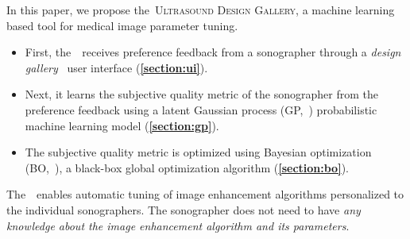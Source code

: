 In this paper, we propose the~\textsc{Ultrasound Design Gallery}, a machine learning based tool for medical image parameter tuning.
\begin{itemize}
    \item[\ding{228}] First, the~\usdg~receives preference feedback from a sonographer through a \textit{design gallery}~\cite{brochu_bayesian_2010, 10.1145/3072959.3073598, koyama_sequential_2020, phan_color_2018, pmlr-v119-mikkola20a} user interface (\textbf{\cref{section:ui}}).
    \vspace{0.02in}
  \item[\ding{228}] Next, it learns the subjective quality metric of the sonographer from the preference feedback using a latent Gaussian process (GP,~\cite{rasmussen_gaussian_2006, pmlr-v119-mikkola20a}) probabilistic machine learning model (\textbf{\cref{section:gp}}).
    \vspace{0.02in}
  \item[\ding{228}] The subjective quality metric is optimized using Bayesian optimization (BO,~\cite{shahriari_taking_2016}), a black-box global optimization algorithm (\textbf{\cref{section:bo}}).
\end{itemize}
The~\usdg~enables automatic tuning of image enhancement algorithms personalized to the individual sonographers.
The sonographer does not need to have \textit{any knowledge about the image enhancement algorithm and its parameters}.



